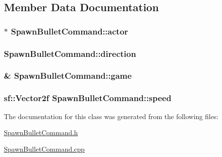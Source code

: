 \subsection{Member Data Documentation}
\hypertarget{class_spawn_bullet_command_a36d5fec5d82d09a70954be0fb1fe519f}{}
\subsubsection[{actor}]{$\ast$ Spawn\+Bullet\+Command\+::actor\hspace{0.3cm}{\ttfamily [protected]}}\label{class_spawn_bullet_command_a36d5fec5d82d09a70954be0fb1fe519f}
\hypertarget{class_spawn_bullet_command_ac1f56a3f5b6c12aa394221576770704b}{}
\subsubsection[{direction}]{ Spawn\+Bullet\+Command\+::direction\hspace{0.3cm}{\ttfamily [private]}}\label{class_spawn_bullet_command_ac1f56a3f5b6c12aa394221576770704b}
\hypertarget{class_spawn_bullet_command_a9e98531440220e01f46fb91b3fa78cef}{}
\subsubsection[{game}]{\& Spawn\+Bullet\+Command\+::game\hspace{0.3cm}{\ttfamily [private]}}\label{class_spawn_bullet_command_a9e98531440220e01f46fb91b3fa78cef}
\hypertarget{class_spawn_bullet_command_a5f302f0a55b2e9102e16f7ff9eec9396}{}
\subsubsection[{speed}]{\setlength{\rightskip}{0pt plus 5cm}sf\+::\+Vector2f Spawn\+Bullet\+Command\+::speed\hspace{0.3cm}{\ttfamily [protected]}}\label{class_spawn_bullet_command_a5f302f0a55b2e9102e16f7ff9eec9396}


The documentation for this class was generated from the following files\+:\begin{DoxyCompactItemize}
\item 
\hyperlink{_spawn_bullet_command_8h}{Spawn\+Bullet\+Command.\+h}\item 
\hyperlink{_spawn_bullet_command_8cpp}{Spawn\+Bullet\+Command.\+cpp}\end{DoxyCompactItemize}
